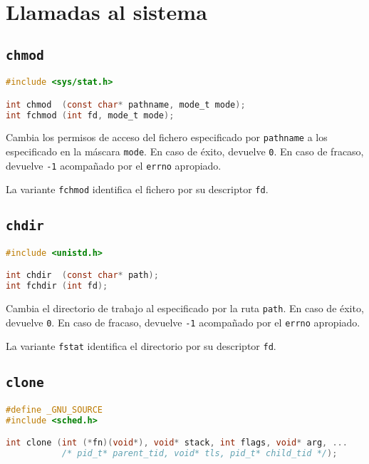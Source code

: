 \chapter{Llamadas al sistema}

\section{\texttt{chmod}}\label{chmod}

\begin{lstlisting}[language=C]
#include <sys/stat.h>

int chmod  (const char* pathname, mode_t mode);
int fchmod (int fd, mode_t mode);
\end{lstlisting}

Cambia los permisos de acceso del fichero especificado por \texttt{pathname} a los especificado en la máscara \texttt{mode}.
En caso de éxito, devuelve \texttt{0}.
En caso de fracaso, devuelve \texttt{-1} acompañado por el \texttt{errno} apropiado.

La variante \texttt{fchmod} identifica el fichero por su descriptor \texttt{fd}.

\section{\texttt{chdir}}\label{chdir}

\begin{lstlisting}[language=C]
#include <unistd.h>

int chdir  (const char* path);
int fchdir (int fd);
\end{lstlisting}

Cambia el directorio de trabajo al especificado por la ruta \texttt{path}.
En caso de éxito, devuelve \texttt{0}.
En caso de fracaso, devuelve \texttt{-1} acompañado por el \texttt{errno} apropiado.

La variante \texttt{fstat} identifica el directorio por su descriptor \texttt{fd}.

\section{\texttt{clone}}\label{clone}

\begin{lstlisting}[language=C]
#define _GNU_SOURCE
#include <sched.h>

int clone (int (*fn)(void*), void* stack, int flags, void* arg, ...
           /* pid_t* parent_tid, void* tls, pid_t* child_tid */);
\end{lstlisting}

